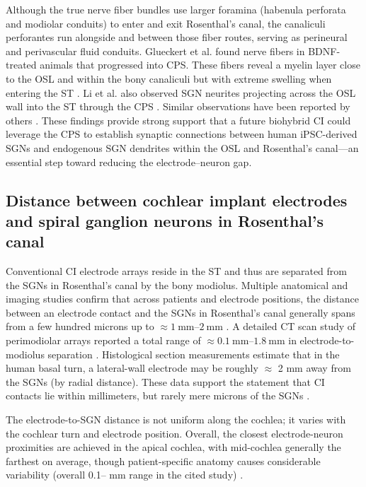 \documentclass[referee,pdflatex, sn-vancouver-num]{sn-jnl}%
\theoremstyle{thmstyleone}%
\theoremstyle{thmstyletwo}%
\theoremstyle{thmstylethree}%
\DeclareRobustCommand{\textendash}{\ifmmode\text{-}\else\leavevmode\hbox{--}\fi}
\begin{document}
Although the true nerve fiber bundles use larger foramina (habenula perforata and modiolar conduits) to enter and exit Rosenthal's canal, the canaliculi perforantes run alongside and between those fiber routes, serving as perineural and perivascular fluid conduits. Glueckert et al. found nerve fibers in BDNF-treated animals that progressed into CPS. These fibers reveal a myelin layer close to the OSL and within the bony canaliculi but with extreme swelling when entering the ST \cite{glueckert2008}. Li et al. also observed SGN neurites projecting across the OSL wall into the ST through the CPS \cite{Li2017}. Similar observations have been reported by others \cite{Staecker1996, Leake2008, Leake2011, Wise2011}.  These findings provide strong support that a future biohybrid CI could leverage the CPS to establish synaptic connections between human iPSC-derived SGNs and endogenous SGN dendrites within the OSL and Rosenthal’s canal—an essential step toward reducing the electrode–neuron gap.

\subsection{Distance between cochlear implant electrodes and spiral ganglion neurons in Rosenthal's canal}
Conventional CI electrode arrays reside in the ST and thus are separated from the SGNs in Rosenthal's canal by the bony modiolus. Multiple anatomical and imaging studies confirm that across patients and electrode positions, the distance between an electrode contact and the SGNs in Rosenthal's canal generally spans from a few hundred microns up to $\approx \SIrange{1}{2}{\mm}$ \cite{Davis2016}. A detailed CT scan study of perimodiolar arrays reported a total range of $\approx \SIrange{0.1}{1.8}{\mm}$ in electrode-to-modiolus separation \cite{Long2014}. Histological section measurements estimate that in the human basal turn, a lateral-wall electrode may be roughly $\approx$ 2 mm away from the SGNs (by radial distance). These data support the statement that CI contacts lie within millimeters, but rarely mere microns of the SGNs \cite{Schmidbauer2023}.

The electrode-to-SGN distance is not uniform along the cochlea; it varies with the cochlear turn and electrode position. Overall, the closest electrode-neuron proximities are achieved in the apical cochlea, with mid-cochlea generally the farthest on average, though patient-specific anatomy causes considerable variability (overall 0.1\textendash1.8 mm range in the cited study) \cite{Long2014}.
\end{document}
